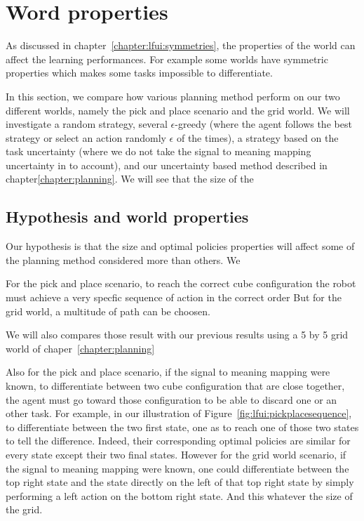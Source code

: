 
\section{Word properties}
\label{chapter:limitations:wordlproperties}



As discussed in chapter~\ref{chapter:lfui:symmetries}, the properties of the world can affect the learning performances. For example some worlds have symmetric properties which makes some tasks impossible to differentiate. 

In this section, we compare how various planning method perform on our two different worlds, namely the pick and place scenario and the grid world. We will investigate a random strategy, several $\epsilon$-greedy (where the agent follows the best strategy or select an action randomly $\epsilon$ of the times), a strategy based on the task uncertainty (where we do not take the signal to meaning mapping uncertainty in to account), and our uncertainty based method described in chapter\ref{chapter:planning}. We will see that the size of the 

\subsection{Hypothesis and world properties}

Our hypothesis is that the size and optimal policies properties will affect some of the planning method considered more than others. We 

For the pick and place scenario, to reach the correct cube configuration the robot must achieve a very specfic sequence of action in the correct order But for the grid world, a multitude of path can be choosen. 

We will also compares those result with our previous results using a 5 by 5 grid world of chaper~\ref{chapter:planning}

Also for the pick and place scenario, if the signal to meaning mapping were known, to differentiate between two cube configuration that are close together, the agent must go toward those configuration to be able to discard one or an other task. For example, in our illustration of Figure~\ref{fig:lfui:pickplacesequence}, to differentiate between the two first state, one as to reach one of those two states to tell the difference. Indeed, their corresponding optimal policies are similar for every state except their two final states. However for the grid world scenario, if the signal to meaning mapping were known, one could differentiate between the top right state and the state directly on the left of that top right state by simply performing a left action on the bottom right state. And this whatever the size of the grid.

